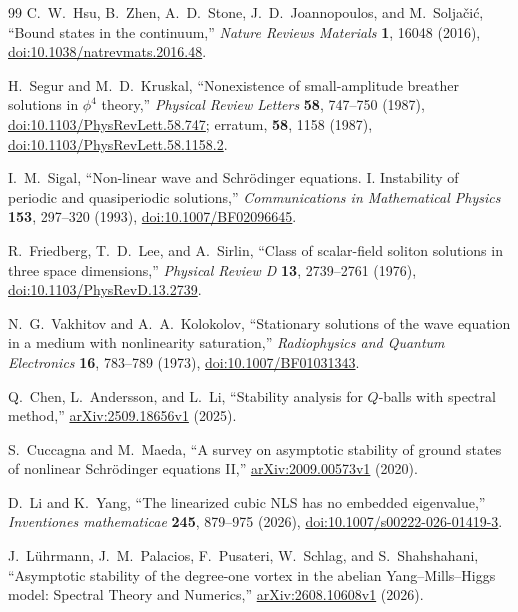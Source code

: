 \begin{thebibliography}{99}
C.~W.~Hsu, B.~Zhen, A.~D.~Stone, J.~D.~Joannopoulos, and M.~Solja\v{c}i\'c,
``Bound states in the continuum,''
\emph{Nature Reviews Materials} \textbf{1}, 16048 (2016),
\href{https://doi.org/10.1038/natrevmats.2016.48}{doi:10.1038/natrevmats.2016.48}.

H.~Segur and M.~D.~Kruskal,
``Nonexistence of small-amplitude breather solutions in $\phi^4$ theory,''
\emph{Physical Review Letters} \textbf{58}, 747--750 (1987),
\href{https://doi.org/10.1103/PhysRevLett.58.747}{doi:10.1103/PhysRevLett.58.747};
erratum, \textbf{58}, 1158 (1987),
\href{https://doi.org/10.1103/PhysRevLett.58.1158.2}{doi:10.1103/PhysRevLett.58.1158.2}.

I.~M.~Sigal,
``Non-linear wave and Schr\"odinger equations. I. Instability of periodic and quasiperiodic solutions,''
\emph{Communications in Mathematical Physics} \textbf{153}, 297--320 (1993),
\href{https://doi.org/10.1007/BF02096645}{doi:10.1007/BF02096645}.

R.~Friedberg, T.~D.~Lee, and A.~Sirlin,
``Class of scalar-field soliton solutions in three space dimensions,''
\emph{Physical Review D} \textbf{13}, 2739--2761 (1976),
\href{https://doi.org/10.1103/PhysRevD.13.2739}{doi:10.1103/PhysRevD.13.2739}.

N.~G.~Vakhitov and A.~A.~Kolokolov,
``Stationary solutions of the wave equation in a medium with nonlinearity saturation,''
\emph{Radiophysics and Quantum Electronics} \textbf{16}, 783--789 (1973),
\href{https://doi.org/10.1007/BF01031343}{doi:10.1007/BF01031343}.

Q.~Chen, L.~Andersson, and L.~Li,
``Stability analysis for $Q$-balls with spectral method,''
\href{https://arxiv.org/abs/2509.18656v1}{arXiv:2509.18656v1} (2025).

S.~Cuccagna and M.~Maeda,
``A survey on asymptotic stability of ground states of nonlinear
Schr\"odinger equations II,''
\href{https://arxiv.org/abs/2009.00573v1}{arXiv:2009.00573v1} (2020).

D.~Li and K.~Yang,
``The linearized cubic NLS has no embedded eigenvalue,''
\emph{Inventiones mathematicae} \textbf{245}, 879--975 (2026),
\href{https://doi.org/10.1007/s00222-026-01419-3}{doi:10.1007/s00222-026-01419-3}.

J.~L\"uhrmann, J.~M.~Palacios, F.~Pusateri, W.~Schlag, and S.~Shahshahani,
``Asymptotic stability of the degree-one vortex in the abelian
Yang--Mills--Higgs model: Spectral Theory and Numerics,''
\href{https://arxiv.org/abs/2608.10608v1}{arXiv:2608.10608v1} (2026).


\end{thebibliography}
